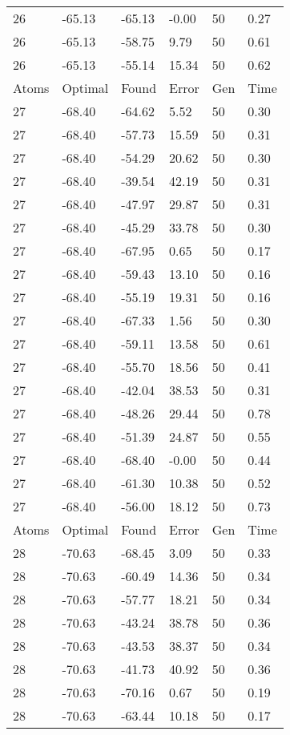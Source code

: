 \documentclass{report}
\begin{document}
\begin{appendix}
\begin{longtable}{llllll}
26 & -65.13 & -65.13 & -0.00 & 50 & 0.27 \\
26 & -65.13 & -58.75 & 9.79 & 50 & 0.61 \\
26 & -65.13 & -55.14 & 15.34 & 50 & 0.62 \\
Atoms & Optimal & Found & Error & Gen & Time \\
27 & -68.40 & -64.62 & 5.52 & 50 & 0.30 \\
27 & -68.40 & -57.73 & 15.59 & 50 & 0.31 \\
27 & -68.40 & -54.29 & 20.62 & 50 & 0.30 \\
27 & -68.40 & -39.54 & 42.19 & 50 & 0.31 \\
27 & -68.40 & -47.97 & 29.87 & 50 & 0.31 \\
27 & -68.40 & -45.29 & 33.78 & 50 & 0.30 \\
27 & -68.40 & -67.95 & 0.65 & 50 & 0.17 \\
27 & -68.40 & -59.43 & 13.10 & 50 & 0.16 \\
27 & -68.40 & -55.19 & 19.31 & 50 & 0.16 \\
27 & -68.40 & -67.33 & 1.56 & 50 & 0.30 \\
27 & -68.40 & -59.11 & 13.58 & 50 & 0.61 \\
27 & -68.40 & -55.70 & 18.56 & 50 & 0.41 \\
27 & -68.40 & -42.04 & 38.53 & 50 & 0.31 \\
27 & -68.40 & -48.26 & 29.44 & 50 & 0.78 \\
27 & -68.40 & -51.39 & 24.87 & 50 & 0.55 \\
27 & -68.40 & -68.40 & -0.00 & 50 & 0.44 \\
27 & -68.40 & -61.30 & 10.38 & 50 & 0.52 \\
27 & -68.40 & -56.00 & 18.12 & 50 & 0.73 \\
Atoms & Optimal & Found & Error & Gen & Time \\
28 & -70.63 & -68.45 & 3.09 & 50 & 0.33 \\
28 & -70.63 & -60.49 & 14.36 & 50 & 0.34 \\
28 & -70.63 & -57.77 & 18.21 & 50 & 0.34 \\
28 & -70.63 & -43.24 & 38.78 & 50 & 0.36 \\
28 & -70.63 & -43.53 & 38.37 & 50 & 0.34 \\
28 & -70.63 & -41.73 & 40.92 & 50 & 0.36 \\
28 & -70.63 & -70.16 & 0.67 & 50 & 0.19 \\
28 & -70.63 & -63.44 & 10.18 & 50 & 0.17 \\

\end{longtable}
\end{appendix}
\end{document}
